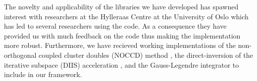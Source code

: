         The novelty and applicability of the libraries we have developed has
        spawned interest with researchers at the Hylleraas Centre at the
        University of Oslo which has led to several researchers using the code.
        As a consequence they have provided us with much feedback on the code
        thus making the implementation more robust.
        Furthermore, we have recieved working implementations of the
        non-orthogonal coupled cluster doubles (NOCCD) method \cite{rolf-nocc},
        the direct-inversion of the iterative subspace (DIIS) acceleration
        \cite{rolf-nocc}, and the Gauss-Legendre \cite{pedersen2018symplectic}
        integrator to include in our framework.
